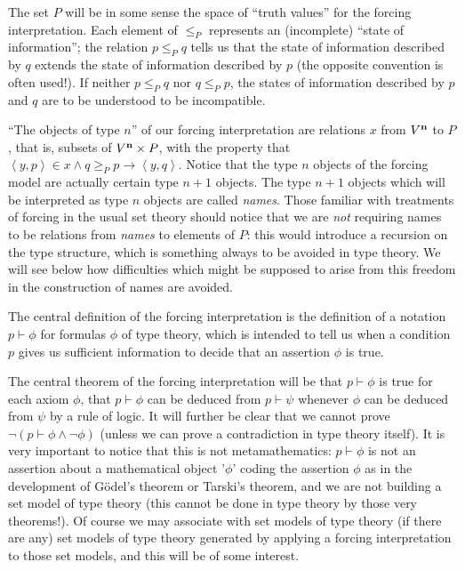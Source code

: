 \documentclass[12pt]{book}
\begin{document}
\begin{description}
The set $P$ will be in some sense the space of ``truth values'' for
the forcing interpretation.  Each element of $\leq_P$ represents an
(incomplete) ``state of information''; the relation $p \leq_P q$ tells
us that the state of information described by $q$ extends the state of
information described by $p$ (the opposite convention is often used!).
If neither $p \leq_P q$ nor $q \leq_P p$, the states of information
described by $p$ and $q$ are to be understood to be incompatible.

``The objects of type $n$'' of our forcing interpretation are
relations $x$ from $V^{\bf n}$ to $P$, that is, subsets of $V^{\bf
n}\times P$, with the property that $\left<y,p\right> \in x \wedge q
\geq_P p \rightarrow \left<y,q\right>$.  Notice that the type $n$
objects of the forcing model are actually certain type $n+1$ objects.
The type $n+1$ objects which will be interpreted as type $n$ objects
are called {\em names\/}.  Those familiar with treatments of forcing
in the usual set theory should notice that we are {\em not\/}
requiring names to be relations from {\em names\/} to elements of $P$:
this would introduce a recursion on the type structure, which is
something always to be avoided in type theory.  We will see below how
difficulties which might be supposed to arise from this freedom in the
construction of names are avoided.

The central definition of the forcing interpretation is the definition
of a notation $p \vdash \phi$ for formulas $\phi$ of type theory,
which is intended to tell us when a condition $p$ gives us sufficient
information to decide that an assertion $\phi$ is true.

The central theorem of the forcing interpretation will be that $p
\vdash \phi$ is true for each axiom $\phi$, that $p \vdash \phi$ can
be deduced from $p \vdash \psi$ whenever $\phi$ can be deduced from
$\psi$ by a rule of logic.  It will further be clear that we cannot
prove $\neg(p \vdash \phi \wedge \neg\phi)$ (unless we can prove a
contradiction in type theory itself).  It is very important to notice
that this is not metamathematics: $p \vdash \phi$ is not an assertion
about a mathematical object '$\phi$' coding the assertion $\phi$ as in
the development of G\"odel's theorem or Tarski's theorem, and we are
not building a set model of type theory (this cannot be done in type
theory by those very theorems!).  Of course we may associate with set
models of type theory (if there are any) set models of type theory
generated by applying a forcing interpretation to those set models,
and this will be of some interest.


\end{description}
\end{document}
